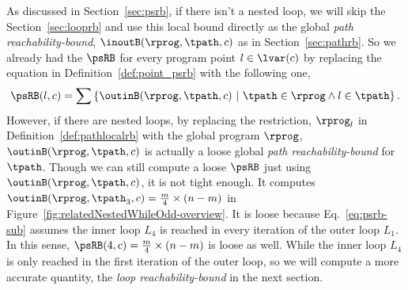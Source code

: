  As discussed in Section~\ref{sec:psrb}, if there isn't a nested loop, we will skip the Section~\ref{sec:looprb} and use this local bound directly as the global \emph{path reachability-bound}, $\inoutB(\rprog, \tpath, c)$ as in Section~\ref{sec:pathrb}. 
 So we already had the $\psRB$ for every program point $l \in \lvar(c)$ by replacing the equation in Definition~\ref{def:point_psrb} with the following one,
 \begin{equation}
 \label{eq:psrb-sub}
 \psRB(l, c) = 
 \sum
 \left\{ \outinB(\rprog, \tpath, c) ~\vert~ \tpath \in \rprog \land 
 l \in \tpath \right\}.
 \end{equation}
 However, if there are nested loops, 
 by replacing the restriction, $\rprog_l$ in Definition~\ref{def:pathlocalrb} with the global program $\rprog$, $\outinB(\rprog, \tpath, c)$ is actually a loose global \emph{path reachability-bound} for $\tpath$. Though we can still compute a loose $\psRB$ just using $\outinB(\rprog, \tpath, c)$, it is not tight enough. 
It computes
$\outinB(\rprog, \tpath_3, c) = \frac{m}{4} \times (n - m)$ in Figure~\ref{fig:relatedNestedWhileOdd-overview}.
It is loose because Eq.~\ref{eq:psrb-sub} assumes the inner loop $L_4$ is reached in every iteration of the outer loop $L_1$. In this sense, $\psRB(4, c) = \frac{m}{4} \times (n - m)$ is loose as well.
While the inner loop $L_4$ is only reached in the first iteration of the outer loop,
so we will compute a more accurate quantity, the \emph{loop reachability-bound} in the next section.

